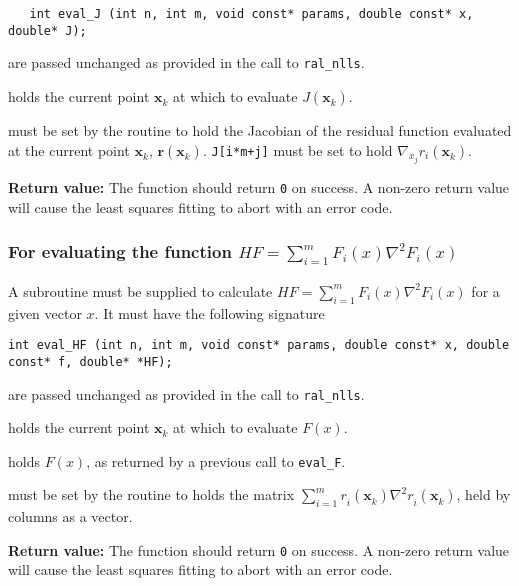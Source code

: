 \documentclass{spec}
\newcommand{\vx}{ {\bm x} } %
\newcommand{\vr}{ {\bm r} } %
\newcommand{\iter}[2][k]{ #2_{#1}^{}} %
\newcommand{\comp}[2][i]{ #2_{#1}^{}} %
\begin{document}
\begin{verbatim}
   int eval_J (int n, int m, void const* params, double const* x, double* J);
\end{verbatim}

\begin{description}
    are passed unchanged as provided in the call to
      {\tt ral\_nlls}.

    holds the current point $\iter{\vx}$ at which to evaluate
      $J(\iter{\vx})$.
  
    must be set by the routine to hold the Jacobian of the residual
      function evaluated at the current point $\iter{\vx}$, $\vr(\iter{\vx})$.
      \texttt{J[i*m+j]} must be set to hold $\nabla_{x_j} r_i(\iter{\vx})$.
\end{description}
\textbf{Return value:} The function should return \texttt{0} on success. A
non-zero return value will cause the least squares fitting to abort with an
error code.

\subsubsection{For evaluating the function $HF = \sum_{i=1}^m F_i(x) \nabla^2 F_i(x)$}
A subroutine must be supplied to calculate $HF = \sum_{i=1}^m F_i(x) \nabla^2 F_i(x)$ for a given vector $x$. It must have the following signature

\begin{verbatim}
int eval_HF (int n, int m, void const* params, double const* x, double const* f, double* *HF);
\end{verbatim}

\begin{description}
    are passed unchanged as provided in the call to
      {\tt ral\_nlls}.

    holds the current point $\iter{\vx}$ at which to evaluate $F(x)$.
  
    holds $F(x)$, as returned by a previous call to \texttt{eval\_F}.

    must be set by the routine to holds the matrix
      $\sum_{i = 1}^m \comp{r}(\iter{\vx})\nabla^2\comp{r}(\iter{\vx})$, held
      by columns as a vector.
\end{description}
\textbf{Return value:} The function should return \texttt{0} on success. A
non-zero return value will cause the least squares fitting to abort with an
error code.
\end{document}
